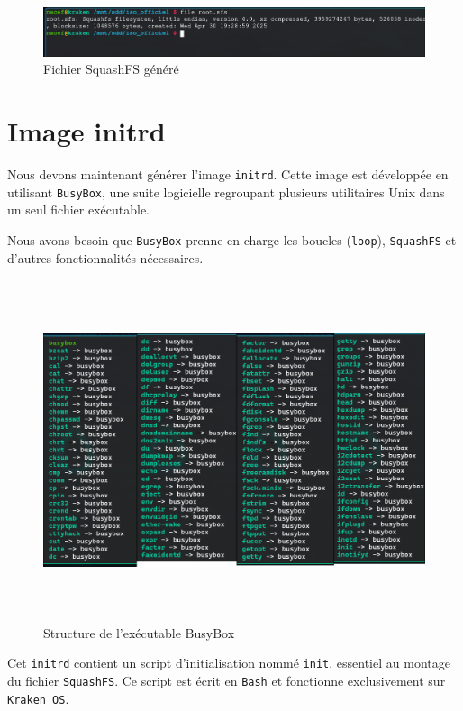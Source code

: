 \begin{figure}[H]
  \centering
  \includegraphics[width=1\textwidth]{images_pfe/rootfsfile.png}
  \caption{Fichier SquashFS généré}
  \label{fig:rootfs}
\end{figure}



\section{Image initrd}

Nous devons maintenant générer l’image \texttt{initrd}.  
Cette image est développée en utilisant \texttt{BusyBox}, une suite logicielle regroupant plusieurs utilitaires Unix dans un seul fichier exécutable.

\noindent
Nous avons besoin que \texttt{BusyBox} prenne en charge les boucles (\texttt{loop}), \texttt{SquashFS} et d’autres fonctionnalités nécessaires.

\begin{figure}[H]
  \centering
  \includegraphics[width=1\textwidth, height=10cm]{images_pfe/busyboxbinary.png}
  \caption{Structure de l'exécutable BusyBox}
  \label{fig:busybox}
\end{figure}

Cet \texttt{initrd} contient un script d’initialisation nommé \texttt{init}, essentiel au montage du fichier \texttt{SquashFS}. Ce script est écrit en \texttt{Bash} et fonctionne exclusivement sur \texttt{Kraken OS}.

